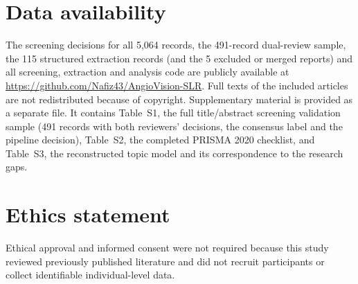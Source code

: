\documentclass[a4paper,fleqn]{cas-dc}
\newcommand{\edit}[1]{{\color{editcolor}#1}}
\begin{document}





\printcredits



\edit{\nocite{R0058,R0099,R0100,R0521,R0554,R0570,R0643,R1213,R1222,R1263,R1362,R1503,R1541,R1565,R1609,R1674,R1680,R1939,R2400,R2411,R2443,R2466,R2490,R2786,R2873,R3052,R3093,R3126,R3129,R3149,R3155,R3164,R3338,R3661,R3707,R3712,R3910,R4114,R4204,R4208,R4220,R4557,R4804,ref10,ref100,ref102,ref104,ref127,ref144,ref148,ref15,ref152,ref155,ref161,ref162,ref172,ref173,ref178,ref179,ref190,ref198,ref2,ref20,ref202,ref208,ref211,ref227,ref25,ref28,ref30,ref32,ref34,ref35,ref36,ref38,ref39,ref4,ref40,ref42,ref43,ref46,ref48,ref50,ref51,ref52,ref56,ref57,ref60,ref62,ref63,ref64,ref65,ref66,ref67,ref69,ref71,ref72,ref74,ref75,ref76,ref78,ref79,ref80,ref82,ref84,ref89,ref91,ref92,ref93,ref94,ref95,ref96,ref97,ref99,shi2021temporal}}

\section*{Data availability}
The screening decisions for all 5,064 records, the 491-record dual-review sample, the \edit{115} structured extraction records \edit{(and the 5 excluded or merged reports)} and all screening, extraction and analysis code are publicly available at \url{https://github.com/Nafiz43/AngioVision-SLR}. Full texts of the included articles are not redistributed because of copyright. Supplementary material is provided as a separate file. It contains Table~S1, the full title/abstract screening validation sample (491 records with both reviewers' decisions, the consensus label and the pipeline decision), Table~S2, the completed PRISMA 2020 \edit{checklist, and Table~S3, the reconstructed topic model and its correspondence to the research gaps.}

\newcommand{\EthicsText}{Ethical approval and informed consent were not required because this study reviewed previously published literature and did not recruit participants or collect identifiable individual-level data.}
\section*{Ethics statement}
\EthicsText
\end{document}
